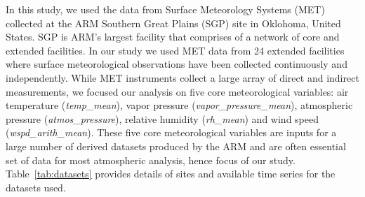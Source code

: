 In this study, we used the data from Surface Meteorology Systems (MET)
collected at the ARM Southern Great Plains (SGP) site in
Oklohoma, United States. SGP is ARM's largest facility that
comprises of a network of core and extended facilities. In our study we
used MET data from 24 extended facilities where surface meteorological
observations have been collected continuously and independently. 
While MET instruments collect a large array of direct and indirect
measurements, we focused our analysis on five core meteorological variables:
air temperature (\textit{temp\_mean}), vapor pressure
(\textit{vapor\_pressure\_mean}),
atmospheric pressure (\textit{atmos\_pressure}), relative humidity
(\textit{rh\_mean}) and wind speed
(\textit{wspd\_arith\_mean}). These five core meteorological variables are
inputs for a large number of derived datasets produced by the ARM and
are often essential set of data for most atmospheric analysis, hence
focus of our study. Table~\ref{tab:datasets} provides details of sites
and available time series for the datasets used.
